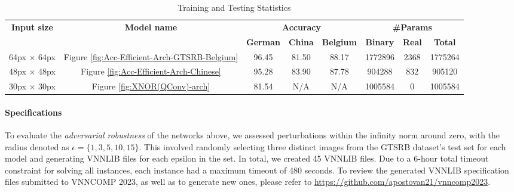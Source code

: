 \documentclass[oneside,11pt,dvipsnames]{book}
\begin{document}
\begin{table}[h]
\caption{Training and Testing Statistics}
\label{tab:stats}
\centering
\scriptsize
\begin{tabular}{|c|c|ccc|ccc|}
\hline
\multirow{2}{*}{\textbf{Input size}} & \multirow{2}{*}{\textbf{Model name}} & \multicolumn{3}{c|}{\textbf{Accuracy}}                                      & \multicolumn{3}{c|}{\textbf{\#Params}}                                      \\ \cline{3-8} 
                            &                             & \multicolumn{1}{c|}{\textbf{German}} & \multicolumn{1}{c|}{\textbf{China}} & \textbf{Belgium} & \multicolumn{1}{c|}{\textbf{Binary}}  & \multicolumn{1}{c|}{\textbf{Real}} & \textbf{Total}   \\ \hline
64px $\times$ 64px          & Figure \ref{fig:Acc-Efficient-Arch-GTSRB-Belgium}                  & \multicolumn{1}{c|}{96.45}  & \multicolumn{1}{c|}{81.50} & 88.17   & \multicolumn{1}{c|}{1772896} & \multicolumn{1}{c|}{2368} & 1775264 \\ \hline
48px $\times$ 48px          & Figure \ref{fig:Acc-Efficient-Arch-Chinese}                  & \multicolumn{1}{c|}{95.28}  & \multicolumn{1}{c|}{83.90} & 87.78   & \multicolumn{1}{c|}{904288}  & \multicolumn{1}{c|}{832}  & 905120  \\ \hline
30px $\times$ 30px          & Figure \ref{fig:XNOR(QConv)-arch}                  & \multicolumn{1}{c|}{81.54}  & \multicolumn{1}{c|}{N/A}   & N/A     & \multicolumn{1}{c|}{1005584} & \multicolumn{1}{c|}{0}    & 1005584 \\ \hline
\end{tabular}
\end{table}
\paragraph*{Specifications} To evaluate the \emph{adversarial robustness} of the networks above, we assessed perturbations within the infinity norm around zero, with the radius denoted as $\epsilon = \{1, 3, 5, 10, 15\}$. This involved randomly selecting three distinct images from the GTSRB dataset's test set for each model and generating \textsc{VNNLIB} files for each epsilon in the set. In total, we created 45 \textsc{VNNLIB} files. Due to a 6-hour total timeout constraint for solving all instances, each instance had a maximum timeout of 480 seconds. To review the generated \textsc{VNNLIB} specification files submitted to VNNCOMP 2023, as well as to generate new ones, please refer to \url{https://github.com/apostovan21/vnncomp2023}.
\end{document}
